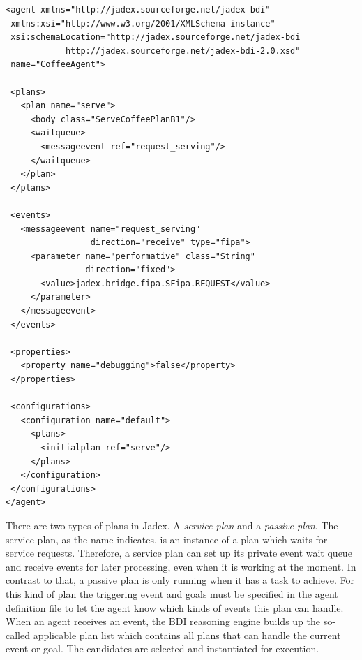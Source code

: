\begin{lstlisting}
<agent xmlns="http://jadex.sourceforge.net/jadex-bdi"
 xmlns:xsi="http://www.w3.org/2001/XMLSchema-instance"
 xsi:schemaLocation="http://jadex.sourceforge.net/jadex-bdi
            http://jadex.sourceforge.net/jadex-bdi-2.0.xsd"
 name="CoffeeAgent">

 <plans>
   <plan name="serve">
     <body class="ServeCoffeePlanB1"/>
     <waitqueue>
       <messageevent ref="request_serving"/>
     </waitqueue>
   </plan>
 </plans>

 <events>
   <messageevent name="request_serving"
                 direction="receive" type="fipa">
     <parameter name="performative" class="String"
                direction="fixed">
       <value>jadex.bridge.fipa.SFipa.REQUEST</value>
     </parameter>
   </messageevent>
 </events>

 <properties>
   <property name="debugging">false</property>
 </properties>

 <configurations>
   <configuration name="default">
     <plans>
       <initialplan ref="serve"/>
     </plans>
   </configuration>
 </configurations>
</agent>
\end{lstlisting}
There are two types of plans in Jadex.
A \emph{service plan} and a \emph{passive plan}.
The service plan, as the name indicates, is an instance of a plan which waits for service requests.
Therefore, a service plan can set up its private event wait queue and receive events for later processing, even when it is working at the moment.
In contrast to that, a passive plan is only running when it has a task to achieve.
For this kind of plan the triggering event and goals must be specified in the agent definition file to let the agent know which kinds of events this plan can handle.
When an agent receives an event, the BDI reasoning engine builds up the so-called applicable plan list which contains all plans that can handle the current event or goal.
The candidates are selected and instantiated for execution.

